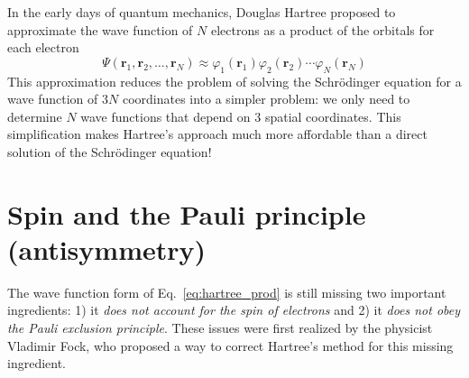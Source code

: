 \documentclass[../Main/chem371-notes.tex]{subfiles}
\begin{document}
In the early days of quantum mechanics, Douglas Hartree proposed to approximate the wave function of $N$ electrons as a product of the orbitals for each electron
\begin{equation}
\label{eq:hartree_prod}
\Psi(\mathbf{r}_1, \mathbf{r}_2, \ldots, \mathbf{r}_N) \approx \varphi_1(\mathbf{r}_1) \varphi_2(\mathbf{r}_2) \cdots \varphi_N(\mathbf{r}_N)
\end{equation}
This approximation reduces the problem of solving the Schr\"{o}dinger equation for a wave function of $3N$ coordinates into a simpler problem: we only need to determine $N$ wave functions that depend on 3 spatial coordinates.
This simplification makes Hartree's approach much more affordable than a direct solution of the Schr\"{o}dinger equation!

\section{Spin and the Pauli principle (antisymmetry)}
The wave function form of Eq.~\eqref{eq:hartree_prod} is still missing two important ingredients: 1) it \emph{does not account for the spin of electrons} and 2) it \emph{does not obey the Pauli exclusion principle}.
These issues were first realized by the physicist Vladimir Fock, who proposed a way to correct Hartree's method for this missing ingredient.
\end{document}
